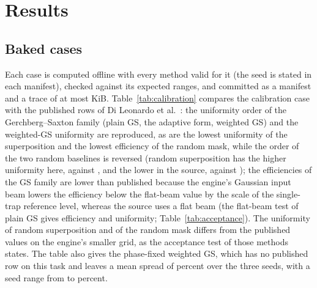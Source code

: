 
\section{Results}\label{sec:results}

\subsection{Baked cases}\label{sec:results-bake}

Each case is computed offline with every method valid for it (the seed is stated in each manifest), checked against its expected ranges, and committed as a manifest and a trace of at most \liveTraceKiB{} KiB. Table~\ref{tab:calibration} compares the calibration case with the published rows of Di Leonardo et al.~\cite{dileonardo}: the uniformity order of the Gerchberg--Saxton family (plain GS, the adaptive form, weighted GS) and the weighted-GS uniformity are reproduced, as are the lowest uniformity of the superposition and the lowest efficiency of the random mask, while the order of the two random baselines is reversed (random superposition has the higher uniformity here, \calUTwo{} against \calUThree, and the lower in the source, \pubUTwo{} against \pubUThree); the efficiencies of the GS family are lower than published because the engine's Gaussian input beam lowers the efficiency below the flat-beam value by the scale of the single-trap reference level, whereas the source uses a flat beam (the flat-beam test of plain GS gives \accFourFlatEff{} efficiency and \accFourFlatUni{} uniformity; Table~\ref{tab:acceptance}). The uniformity of random superposition and of the random mask differs from the published values on the engine's smaller grid, as the acceptance test of those methods states. The table also gives the phase-fixed weighted GS, which has no published row on this task and leaves a mean spread of \calSigmaSeven{} percent over the three seeds, with a seed range from \calSigmaSevenLo{} to \calSigmaSevenHi{} percent.




